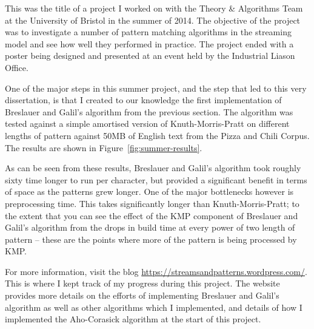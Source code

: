 \documentclass[ %
                    author={Dominic Joseph Moylett},
                    degree={MEng},
                     title={Dictionary Matching with Fingerprints},
                  subtitle={An Empirical Analysis},
                      type={research},
                      year={2015} ]{dissertation}
\begin{document}
This was the title of a project I worked on with the Theory \& Algorithms Team at the University of Bristol in the summer of 2014. The objective of the project was to investigate a number of pattern matching algorithms in the streaming model and see how well they performed in practice. The project ended with a poster being designed and presented at an event held by the Industrial Liason Office.

One of the major steps in this summer project, and the step that led to this very dissertation, is that I created to our knowledge the first implementation of Breslauer and Galil's algorithm from the previous section. The algorithm was tested against a simple amortised version of Knuth-Morris-Pratt on different lengths of pattern against 50MB of English text from the Pizza and Chili Corpus. The results are shown in Figure~\ref{fig:summer-results}.

As can be seen from these results, Breslauer and Galil's algorithm took roughly sixty time longer to run per character, but provided a significant benefit in terms of space as the patterns grew longer. One of the major bottlenecks however is preprocessing time. This takes significantly longer than Knuth-Morris-Pratt; to the extent that you can see the effect of the KMP component of Breslauer and Galil's algorithm from the drops in build time at every power of two length of pattern -- these are the points where more of the pattern is being processed by KMP.

For more information, visit the blog \url{https://streamsandpatterns.wordpress.com/}. This is where I kept track of my progress during this project. The website provides more details on the efforts of implementing Breslauer and Galil's algorithm as well as other algorithms which I implemented, and details of how I implemented the Aho-Corasick algorithm at the start of this project.
\end{document}
